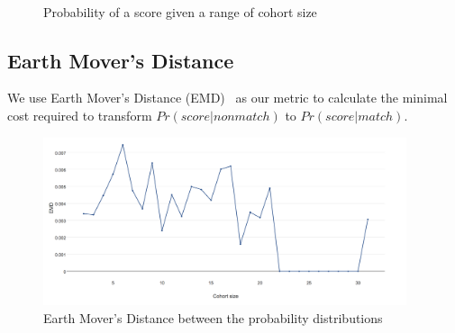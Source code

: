 \begin{figure}[ht]
  \centering
  \label{fig:otago_pscohort}\\
  \label{fig:otago_psnoncohort}
  \caption{Probability of a score given a range of cohort size}
\end{figure}

\subsection{Earth Mover's Distance}

We use Earth Mover's Distance (EMD)~\cite{emd00} as our metric to calculate the
minimal cost required to transform $Pr(score|nonmatch)$ to $Pr(score|match)$.

\begin{figure}[ht]
  \centering
  \includegraphics[width=0.95\textwidth]{dataset/grand/emd}
  \caption{Earth Mover's Distance between the probability distributions}
  \label{fig:grand_emd}
\end{figure}

